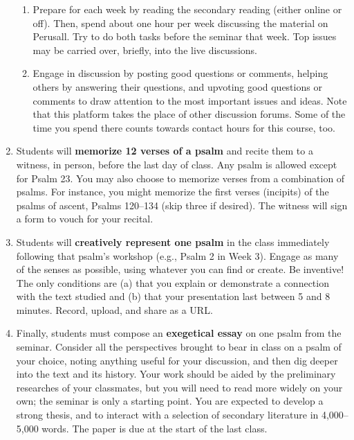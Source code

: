 \documentclass[titlepage]{article}
\begin{document}
\begin{enumerate}
\begin{enumerate}
		\item Prepare for each week by reading the secondary reading
		(either online or off). Then, spend about one hour per week
		discussing the material on Perusall. Try to do both tasks before
		the seminar that week. Top issues may be carried over, briefly,
		into the live discussions.

		\item Engage in discussion by posting good questions or
		comments, helping others by answering their questions, and
		upvoting good questions or comments to draw attention to the
		most important issues and ideas. Note that this platform takes
		the place of other discussion forums. Some of the time you spend
		there counts towards contact hours for this course, too.

	\end{enumerate}

	\item Students will \textbf{memorize 12 verses of a psalm} and
	recite them to a witness, in person, before the last day of class.
	Any psalm is allowed except for Psalm 23. You may also choose to
	memorize verses from a combination of psalms. For instance, you
	might memorize the first verses (incipits) of the psalms of ascent,
	Psalms 120–134 (skip three if desired). The witness will sign a form
	to vouch for your recital.

	\item Students will \textbf{creatively represent one psalm} in the
	class immediately following that psalm’s workshop (e.g., Psalm 2 in
	Week 3). Engage as many of the senses as possible, using whatever
	you can find or create. Be inventive! The only conditions are (a)
	that you explain or demonstrate a connection with the text studied
	and (b) that your presentation last between 5 and 8 minutes. Record,
	upload, and share as a URL.

	\item Finally, students must compose an \textbf{exegetical essay} on
	one psalm from the seminar. Consider all the perspectives brought to
	bear in class on a psalm of your choice, noting anything useful for
	your discussion, and then dig deeper into the text and its history.
	Your work should be aided by the preliminary researches of your
	classmates, but you will need to read more widely on your own; the
	seminar is only a starting point. You are expected to develop a
	strong thesis, and to interact with a selection of secondary
	literature in 4,000--5,000 words. The paper is due at the start of
	the last class.

\end{enumerate}
\end{document}
